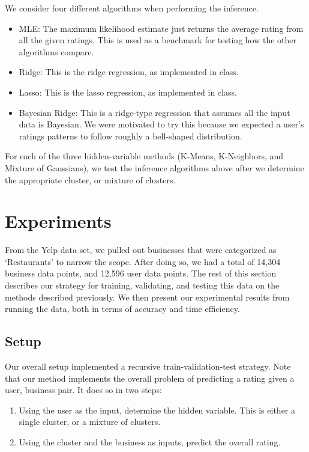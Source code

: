 \documentclass[11pt]{article}
\begin{document}
We consider four different algorithms when performing the inference.

\begin{itemize}
\item MLE: The maximum likelihood estimate just returns the average rating from all the given ratings. This is used as a benchmark for testing how the other algorithms compare.
\item Ridge: This is the ridge regression, as implemented in class.
\item Lasso: This is the lasso regression, as implemented in class.
\item Bayesian Ridge: This is a ridge-type regression that assumes all the input data is Bayesian. We were motivated to try this because we expected a user's ratings patterns to follow roughly a bell-shaped distribution.
\end{itemize}

For each of the three hidden-variable methods (K-Means, K-Neighbors, and Mixture of Gaussians), we test the inference algorithms above after we determine the appropriate cluster, or mixture of clusters.

\section{Experiments}
From the Yelp data set, we pulled out businesses that were categorized as `Restaurants' to narrow the scope. After doing so, we had a total of 14,304 business data points, and 12,596 user data points. The rest of this section describes our strategy for training, validating, and testing this data on the methods described previously. We then present our experimental results from running the data, both in terms of accuracy and time efficiency.

\subsection{Setup}
Our overall setup implemented a recursive train-validation-test strategy. Note that our method implements the overall problem of predicting a rating given a user, business pair. It does so in two steps:
\begin{enumerate}
\item Using the user as the input, determine the hidden variable. This is either a single cluster, or a mixture of clusters.
\item Using the cluster and the business as inputs, predict the overall rating.
\end{enumerate}
\end{document}
